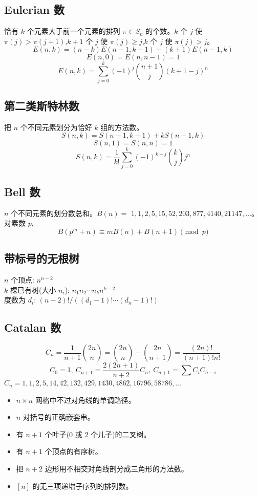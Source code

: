 	\subsection{Eulerian 数}
		恰有 $k$ 个元素大于前一个元素的排列 $\pi \in S_n$ 的个数。$k$ 个 $j$ 使 $\pi(j)>\pi(j+1)$,$k+1$ 个 $j$ 使 $\pi(j)\geq j$,$k$ 个 $j$ 使 $\pi(j)>j$。
		$$E(n,k) = (n-k)E(n-1,k-1) + (k+1)E(n-1,k)$$
		$$E(n,0) = E(n,n-1) = 1$$
		$$E(n,k) = \sum_{j=0}^k(-1)^j\binom{n+1}{j}(k+1-j)^n$$

	\subsection{第二类斯特林数}
		把 $n$ 个不同元素划分为恰好 $k$ 组的方法数。
		$$S(n,k) = S(n-1,k-1) + k S(n-1,k)$$
		$$S(n,1) = S(n,n) = 1$$
		$$S(n,k) = \frac{1}{k!}\sum_{j=0}^k (-1)^{k-j}\binom{k}{j}j^n$$

	\subsection{Bell 数}
		$n$ 个不同元素的划分数总和。$B(n) =$
		$1, 1, 2, 5, 15, 52, 203, 877, 4140, 21147, \dots$。对素数 $p$,
		\[ B(p^m+n)\equiv mB(n)+B(n+1) \pmod{p} \]

	\subsection{带标号的无根树}
		$n$ 个顶点: $n^{n-2}$ \\
		$k$ 棵已有树(大小 $n_i$): $n_1n_2\cdots n_k n^{k-2}$ \\
		度数为 $d_i$: $(n-2)! / ((d_1-1)! \cdots (d_n-1)!)$

	\subsection{Catalan 数}
		\[ C_n=\frac{1}{n+1}\binom{2n}{n}= \binom{2n}{n}-\binom{2n}{n+1} = \frac{(2n)!}{(n+1)!n!} \]
		\[ C_0=1,\ C_{n+1} = \frac{2(2n+1)}{n+2}C_n,\ C_{n+1}=\sum C_iC_{n-i} \]
		${C_n = 1, 1, 2, 5, 14, 42, 132, 429, 1430, 4862, 16796, 58786, \dots}$
		\begin{itemize}[noitemsep]
			\item $n\times n$ 网格中不过对角线的单调路径。
			\item $n$ 对括号的正确嵌套串。
			\item 有 $n+1$ 个叶子(0 或 2 个儿子)的二叉树。
			\item 有 $n+1$ 个顶点的有序树。
			\item 把 $n+2$ 边形用不相交对角线剖分成三角形的方法数。
			\item $[n]$ 的无三项递增子序列的排列数。
		\end{itemize}
